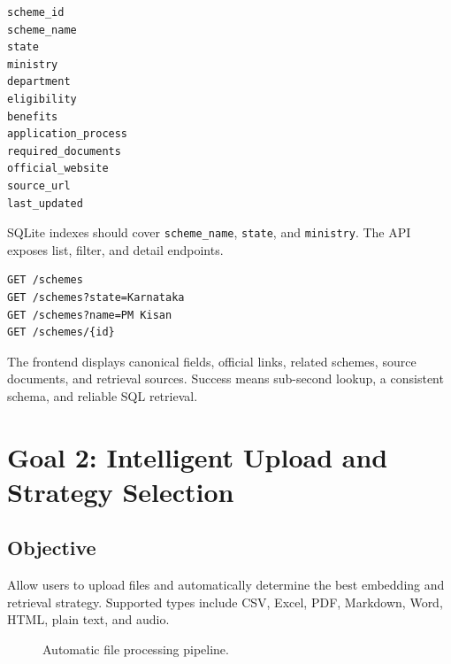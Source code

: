 \documentclass[11pt]{article}
\begin{document}
\begin{lstlisting}[language=SQL,caption={Canonical scheme fields.}]
scheme_id
scheme_name
state
ministry
department
eligibility
benefits
application_process
required_documents
official_website
source_url
last_updated
\end{lstlisting}

SQLite indexes should cover \texttt{scheme\_name}, \texttt{state}, and
\texttt{ministry}. The API exposes list, filter, and detail endpoints.

\begin{lstlisting}[caption={Scheme API endpoints.}]
GET /schemes
GET /schemes?state=Karnataka
GET /schemes?name=PM Kisan
GET /schemes/{id}
\end{lstlisting}

The frontend displays canonical fields, official links, related schemes, source
documents, and retrieval sources. Success means sub-second lookup, a consistent schema,
and reliable SQL retrieval.

\section{Goal 2: Intelligent Upload and Strategy Selection}

\subsection{Objective}
Allow users to upload files and automatically determine the best embedding and retrieval
strategy. Supported types include CSV, Excel, PDF, Markdown, Word, HTML, plain text, and
audio.

\begin{figure}[h]
\centering
{}
\caption{Automatic file processing pipeline.}
\end{figure}
\end{document}
